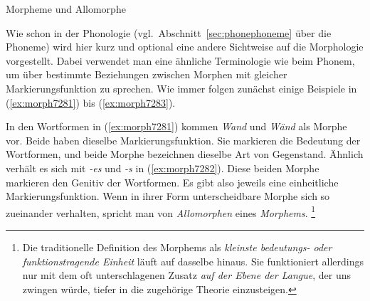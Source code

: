 \begin{Vertiefung}{Morpheme und Allomorphe}

\label{vert:morphemeallomorphe}

\noindent Wie schon in der Phonologie (vgl.\ Abschnitt~\ref{sec:phonephoneme} über die Phoneme) wird hier kurz und optional eine andere Sichtweise auf die Morphologie vorgestellt.
Dabei verwendet man eine ähnliche Terminologie wie beim Phonem, um über bestimmte Beziehungen zwischen Morphen mit gleicher Markierungsfunktion zu sprechen.
Wie immer folgen zunächst einige Beispiele in (\ref{ex:morph7281}) bis (\ref{ex:morph7283}).

\begin{exe}
  \ex\label{ex:morph7281}
  \begin{xlist}
  \end{xlist}
  \ex\label{ex:morph7282}
  \begin{xlist}
  \end{xlist}
  \ex\label{ex:morph7283}
  \begin{xlist}
  \end{xlist}
\end{exe}

In den Wortformen in (\ref{ex:morph7281}) kommen \textit{Wand} und \textit{Wänd} als Morphe vor.
Beide haben dieselbe Markierungsfunktion.
Sie markieren die Bedeutung der Wortformen, und beide Morphe bezeichnen dieselbe Art von Gegenstand.
Ähnlich verhält es sich mit \textit{-es} und \textit{-s} in (\ref{ex:morph7282}).
Diese beiden Morphe markieren den Genitiv der Wortformen.
Es gibt also jeweils eine einheitliche Markierungsfunktion.
Wenn in ihrer Form unterscheidbare Morphe sich so zueinander verhalten, spricht man von \textit{Allomorphen} eines \textit{Morphems}.%
\footnote{Die traditionelle Definition des Morphems als \textit{kleinste bedeutungs- oder funktionstragende Einheit} läuft auf dasselbe hinaus.
Sie funktioniert allerdings nur mit dem oft unterschlagenen Zusatz \textit{auf der Ebene der Langue}, der uns zwingen würde, tiefer in die zugehörige Theorie einzusteigen.}



\end{Vertiefung}
